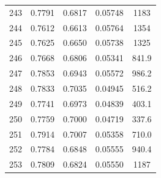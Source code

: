 \documentclass[11pt,twocolumn]{article}
\begin{document}
\begin{center}
\begin{tabular}{ccccc}
243    &     0.7791 &      0.6817 &        0.05748 &             1183 \\
244    &     0.7612 &      0.6613 &        0.05764 &             1354 \\
245    &     0.7625 &      0.6650 &        0.05738 &             1325 \\
246    &     0.7668 &      0.6806 &        0.05341 &            841.9 \\
247    &     0.7853 &      0.6943 &        0.05572 &            986.2 \\
248    &     0.7833 &      0.7035 &        0.04945 &            516.2 \\
249    &     0.7741 &      0.6973 &        0.04839 &            403.1 \\
250    &     0.7759 &      0.7000 &        0.04719 &            337.6 \\
251    &     0.7914 &      0.7007 &        0.05358 &            710.0 \\
252    &     0.7784 &      0.6848 &        0.05555 &            940.4 \\
253    &     0.7809 &      0.6824 &        0.05550 &             1187 \\
\bottomrule
\end{tabular}


\end{center}
\end{document}
